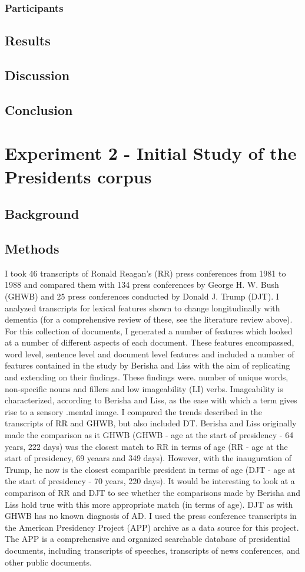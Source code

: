 \documentclass{article}
\begin{document}
\subsubsection{Participants}
\subsection{Results}
\subsection{Discussion}
\subsection{Conclusion}
\section{Experiment 2 - Initial Study of the Presidents corpus}
\subsection{Background}
\subsection{Methods}
I took 46 transcripts of Ronald Reagan’s (RR) press conferences from 1981 to 1988 and compared them with 134 press conferences by George H. W. Bush (GHWB) and 25 press conferences conducted by Donald J. Trump (DJT).  I analyzed transcripts for lexical features shown to change longitudinally with dementia  (for a comprehensive review of these, see the literature review above). For this collection of documents, I generated a number of features which looked at a number of different aspects of each document. These features encompassed, word level, sentence level and document level features and included a number of features contained in the study by Berisha and Liss with the aim of replicating and extending on their findings. These findings were. number of unique words, non-specific nouns and fillers and low imageability (LI) verbs. Imageability is characterized, according to Berisha and Liss, as the ease with which a term gives rise to a sensory .mental image. I compared the trends described in the transcripts of RR and GHWB, but also included DT. Berisha and Liss originally made the comparison as it GHWB (GHWB - age at the start of presidency - 64 years, 222 days) was the closest match to RR in terms of age (RR  - age at the start of presidency, 69 yeaars and 349 days). However, with the inauguration of Trump, he now is the closest comparible president in terms of age (DJT - age at the start of presidency - 70 years, 220 days). It would be interesting to look at a comparison of RR and DJT to see whether the comparisons made by Berisha and Liss hold true with this more appropriate match (in terms of age). DJT as with GHWB has no known diagnosis of AD. I used the press conference transcripts in the American Presidency Project (APP) archive as a data source for this project. The APP is a comprehensive and organized searchable database of presidential documents, including transcripts of speeches, transcripts of news conferences, and other public documents.
\end{document}
